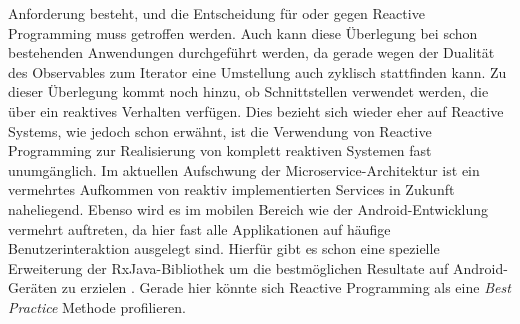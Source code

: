 Anforderung besteht, und die Entscheidung für oder gegen Reactive Programming muss getroffen werden. Auch kann diese Überlegung bei schon bestehenden Anwendungen durchgeführt werden, da gerade wegen der Dualität des Observables zum Iterator eine Umstellung auch zyklisch stattfinden kann. Zu dieser Überlegung kommt noch hinzu, ob Schnittstellen verwendet werden, die über ein reaktives Verhalten verfügen. Dies bezieht sich wieder eher auf Reactive Systems, wie jedoch schon erwähnt, ist die Verwendung von Reactive Programming zur Realisierung von komplett reaktiven Systemen fast unumgänglich. Im aktuellen Aufschwung der Microservice-Architektur ist ein vermehrtes Aufkommen von reaktiv implementierten Services in Zukunft naheliegend. Ebenso wird es im mobilen Bereich wie der Android-Entwicklung vermehrt auftreten, da hier fast alle Applikationen auf häufige Benutzerinteraktion ausgelegt sind. Hierfür gibt es schon eine spezielle Erweiterung der RxJava-Bibliothek um die bestmöglichen Resultate auf Android-Geräten zu erzielen \cite{android}. Gerade hier könnte sich Reactive Programming als eine \textit{Best Practice} Methode profilieren.
